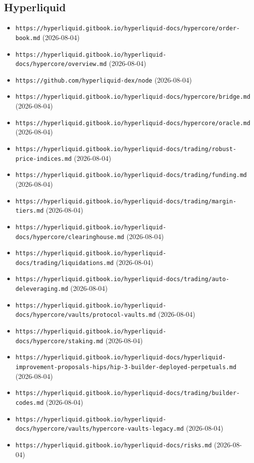 \subsection*{Hyperliquid}
\begin{itemize}\setlength{\itemsep}{0pt}\small
\item \texttt{https://hyperliquid.gitbook.io/hyperliquid-docs/hypercore/order-book.md} (2026-08-04)
\item \texttt{https://hyperliquid.gitbook.io/hyperliquid-docs/hypercore/overview.md} (2026-08-04)
\item \texttt{https://github.com/hyperliquid-dex/node} (2026-08-04)
\item \texttt{https://hyperliquid.gitbook.io/hyperliquid-docs/hypercore/bridge.md} (2026-08-04)
\item \texttt{https://hyperliquid.gitbook.io/hyperliquid-docs/hypercore/oracle.md} (2026-08-04)
\item \texttt{https://hyperliquid.gitbook.io/hyperliquid-docs/trading/robust-price-indices.md} (2026-08-04)
\item \texttt{https://hyperliquid.gitbook.io/hyperliquid-docs/trading/funding.md} (2026-08-04)
\item \texttt{https://hyperliquid.gitbook.io/hyperliquid-docs/trading/margin-tiers.md} (2026-08-04)
\item \texttt{https://hyperliquid.gitbook.io/hyperliquid-docs/hypercore/clearinghouse.md} (2026-08-04)
\item \texttt{https://hyperliquid.gitbook.io/hyperliquid-docs/trading/liquidations.md} (2026-08-04)
\item \texttt{https://hyperliquid.gitbook.io/hyperliquid-docs/trading/auto-deleveraging.md} (2026-08-04)
\item \texttt{https://hyperliquid.gitbook.io/hyperliquid-docs/hypercore/vaults/protocol-vaults.md} (2026-08-04)
\item \texttt{https://hyperliquid.gitbook.io/hyperliquid-docs/hypercore/staking.md} (2026-08-04)
\item \texttt{https://hyperliquid.gitbook.io/hyperliquid-docs/hyperliquid-improvement-proposals-hips/hip-3-builder-deployed-perpetuals.md} (2026-08-04)
\item \texttt{https://hyperliquid.gitbook.io/hyperliquid-docs/trading/builder-codes.md} (2026-08-04)
\item \texttt{https://hyperliquid.gitbook.io/hyperliquid-docs/hypercore/vaults/hypercore-vaults-legacy.md} (2026-08-04)
\item \texttt{https://hyperliquid.gitbook.io/hyperliquid-docs/risks.md} (2026-08-04)
\end{itemize}

